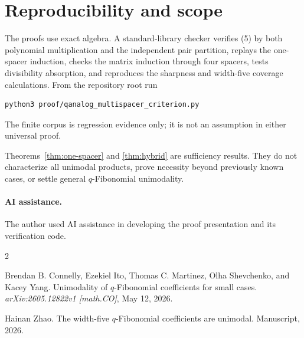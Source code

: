\documentclass[11pt]{article}
\begin{document}
\section{Reproducibility and scope}

The proofs use exact algebra.  A standard-library checker verifies (5) by
both polynomial multiplication and the independent pair partition, replays
the one-spacer induction, checks the matrix induction through four spacers,
tests divisibility absorption, and reproduces the sharpness and width-five
coverage calculations.  From the repository root run
\begin{verbatim}
python3 proof/qanalog_multispacer_criterion.py
\end{verbatim}
The finite corpus is regression evidence only; it is not an assumption in
either universal proof.

Theorems~\ref{thm:one-spacer} and \ref{thm:hybrid} are sufficiency results.
They do not characterize all unimodal products, prove necessity beyond
previously known cases, or settle general \(q\)-Fibonomial unimodality.

\paragraph{AI assistance.}
The author used AI assistance in developing the proof presentation and its
verification code.

\begin{thebibliography}{2}

Brendan B. Connelly, Ezekiel Ito, Thomas C. Martinez, Olha Shevchenko, and
Kacey Yang.
\newblock Unimodality of \(q\)-Fibonomial coefficients for small cases.
\newblock \emph{arXiv:2605.12822v1 [math.CO]}, May 12, 2026.

Hainan Zhao.
\newblock The width-five \(q\)-Fibonomial coefficients are unimodal.
\newblock Manuscript, 2026.

\end{thebibliography}
\end{document}
